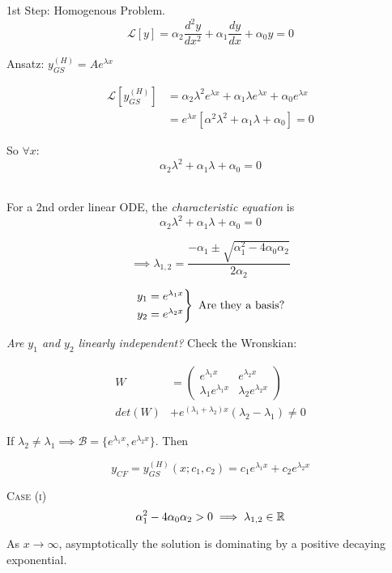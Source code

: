 \documentclass[10pt]{scrartcl}
\begin{document}
1st Step: Homogenous Problem. 
\[\mathcal{L}[y] = \alpha_2\frac{d^2y}{dx^2} + \alpha_1\frac{dy}{dx} + \alpha_0y = 0\]

Ansatz: $y_{GS}^{(H)} = Ae^{\lambda x}$

\[
\begin{aligned}
  \mathcal{L}[y_{GS}^{(H)}] &= \alpha_2\lambda^2e^{\lambda x}+ \alpha_1\lambda e^{\lambda x} + \alpha_0e^{\lambda x}\\
  &= e^{\lambda x}[\alpha^2\lambda^2 + \alpha_1\lambda + \alpha_0] = 0
\end{aligned}
\]

So $\forall x$: 
\[\alpha_2\lambda^2 +\alpha_1\lambda + \alpha_0 = 0\]~

\begin{definition}
For a 2nd order linear ODE, the \emph{characteristic equation} is
	\[\alpha_2\lambda^2 +\alpha_1\lambda + \alpha_0 = 0\]
\end{definition}


\[\implies \lambda_{1,2} = \frac{-\alpha_1 \pm \sqrt{\alpha_1^2 -4\alpha_0\alpha_2}}{2\alpha_2}\]

\[
  \begin{rcases*}
  y_1 = e^{\lambda_1x}\\
  y_2 = e^{\lambda_2x}	
  \end{rcases*}
  \mbox{ Are they a basis?}
\]

\emph{Are $y_1$ and $y_2$ linearly independent?} Check the Wronskian: 

\[
\begin{aligned}
  W &= \begin{pmatrix}
 e^{\lambda_1x} & e^{\lambda_2x}\\
 \lambda_1e^{\lambda_1x} & \lambda_2e^{\lambda_2x}	
 \end{pmatrix}\\[0.2cm]
 det(W) &+ e^{(\lambda_1+\lambda_2)x}(\lambda_2-\lambda_1) \neq 0
\end{aligned}
\]

If $\lambda_2 \neq \lambda_1 \implies \mathcal{B} = \{e^{\lambda_1x},e^{\lambda_2x}\}$. Then 

\[y_{CF} = y^{(H)}_{GS}(x;c_1,c_2) = c_1e^{\lambda_1x}+c_2e^{\lambda_2x}\]\vspace*{5pt}

\textsc{Case (i)} 
\[\alpha_1^2 - 4\alpha_0\alpha_2 > 0\implies \lambda_{1,2} \in\mathbb{R}\]

As $x \to \infty$, asymptotically the solution is dominating by a positive decaying exponential. \\
\end{document}
